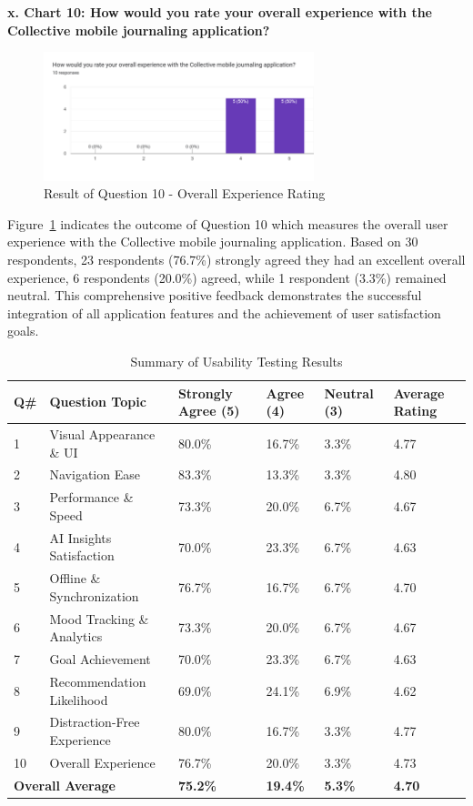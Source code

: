 \textbf{x. Chart 10: How would you rate your overall experience with the Collective mobile journaling application?}

\begin{figure}[H]
\centering
\includegraphics[width=0.7\textwidth]{files/imgs/survey/chart10_overall_experience.png}
\caption{Result of Question 10 - Overall Experience Rating}
\label{fig:chart10-overall}
\end{figure}

Figure~\ref{fig:chart10-overall} indicates the outcome of Question 10 which measures the overall user experience with the Collective mobile journaling application. Based on 30 respondents, 23 respondents (76.7\%) strongly agreed they had an excellent overall experience, 6 respondents (20.0\%) agreed, while 1 respondent (3.3\%) remained neutral. This comprehensive positive feedback demonstrates the successful integration of all application features and the achievement of user satisfaction goals.

\begin{table}[H]
\centering
\caption{Summary of Usability Testing Results}
\label{tab:usability-summary}
\begin{tabular}{|p{1cm}|p{8cm}|p{1.5cm}|p{1.5cm}|p{1.5cm}|p{1.5cm}|}
\hline
\textbf{Q\#} & \textbf{Question Topic} & \textbf{Strongly Agree (5)} & \textbf{Agree (4)} & \textbf{Neutral (3)} & \textbf{Average Rating} \\
\hline
1 & Visual Appearance \& UI & 80.0\% & 16.7\% & 3.3\% & 4.77 \\
\hline
2 & Navigation Ease & 83.3\% & 13.3\% & 3.3\% & 4.80 \\
\hline
3 & Performance \& Speed & 73.3\% & 20.0\% & 6.7\% & 4.67 \\
\hline
4 & AI Insights Satisfaction & 70.0\% & 23.3\% & 6.7\% & 4.63 \\
\hline
5 & Offline \& Synchronization & 76.7\% & 16.7\% & 6.7\% & 4.70 \\
\hline
6 & Mood Tracking \& Analytics & 73.3\% & 20.0\% & 6.7\% & 4.67 \\
\hline
7 & Goal Achievement & 70.0\% & 23.3\% & 6.7\% & 4.63 \\
\hline
8 & Recommendation Likelihood & 69.0\% & 24.1\% & 6.9\% & 4.62 \\
\hline
9 & Distraction-Free Experience & 80.0\% & 16.7\% & 3.3\% & 4.77 \\
\hline
10 & Overall Experience & 76.7\% & 20.0\% & 3.3\% & 4.73 \\
\hline
\multicolumn{2}{|l|}{\textbf{Overall Average}} & \textbf{75.2\%} & \textbf{19.4\%} & \textbf{5.3\%} & \textbf{4.70} \\
\hline
\end{tabular}
\end{table}


